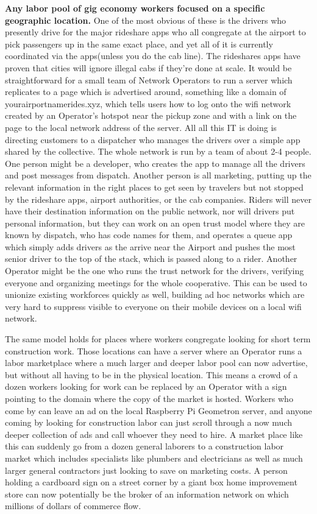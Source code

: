 \documentclass{report}
\begin{document}
\textbf{Any labor pool of gig economy workers focused on a specific
geographic location.} One of the most obvious of these is the drivers
who presently drive for the major rideshare apps who all congregate at
the airport to pick passengers up in the same exact place, and yet all
of it is currently coordinated via the apps(unless you do the cab line).
The rideshares apps have proven that cities will ignore illegal cabs if
they're done at scale. It would be straightforward for a small team of
Network Operators to run a server which replicates to a page which is
advertised around, something like a domain of yourairportnamerides.xyz,
which tells users how to log onto the wifi network created by an
Operator's hotspot near the pickup zone and with a link on the page to
the local network address of the server. All all this IT is doing is
directing customers to a dispatcher who manages the drivers over a
simple app shared by the collective. The whole network is run by a team
of about 2-4 people. One person might be a developer, who creates the
app to manage all the drivers and post messages from dispatch. Another
person is all marketing, putting up the relevant information in the
right places to get seen by travelers but not stopped by the rideshare
apps, airport authorities, or the cab companies. Riders will never have
their destination information on the public network, nor will drivers
put personal information, but they can work on an open trust model where
they are known by dispatch, who has code names for them, and operates a
queue app which simply adds drivers as the arrive near the Airport and
pushes the most senior driver to the top of the stack, which is passed
along to a rider. Another Operator might be the one who runs the trust
network for the drivers, verifying everyone and organizing meetings for
the whole cooperative. This can be used to unionize existing workforces
quickly as well, building ad hoc networks which are very hard to
suppress visible to everyone on their mobile devices on a local wifi
network.

The same model holds for places where workers congregate looking for
short term construction work. Those locations can have a server where an
Operator runs a labor marketplace where a much larger and deeper labor
pool can now advertise, but without all having to be in the physical
location. This means a crowd of a dozen workers looking for work can be
replaced by an Operator with a sign pointing to the domain where the
copy of the market is hosted. Workers who come by can leave an ad on the
local Raspberry Pi Geometron server, and anyone coming by looking for
construction labor can just scroll through a now much deeper collection
of ads and call whoever they need to hire. A market place like this can
suddenly go from a dozen general laborers to a construction labor market
which includes specialists like plumbers and electricians as well as
much larger general contractors just looking to save on marketing costs.
A person holding a cardboard sign on a street corner by a giant box home
improvement store can now potentially be the broker of an information
network on which millions of dollars of commerce flow.
\end{document}
